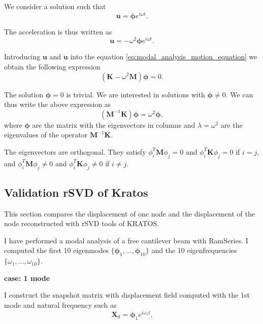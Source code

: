 \documentclass{article}
\begin{document}
We consider a solution such that
\begin{equation}
  \bm{u} = \bm{\phi} e^{i \omega t}.
\end{equation}

The acceleration is thus written as
\begin{equation}
  \bm{\ddot{u}} = -\omega^2 \bm{\phi} e^{i \omega t}.
\end{equation}

Introducing $\bm{u}$ and $\bm{\ddot{u}}$ into the equation \ref{eq:modal_analysis_motion_equation} we obtain the following expression
\begin{equation}
  (\bm{K} - \omega^2 \bm{M}) \bm{\phi} = 0.
\end{equation}

The solution $\bm{\phi} = 0$ is trivial. We are interested in solutions with $\bm{\phi} \neq 0$. We can thus write the above expression as
\begin{equation}
  (\bm{M}^{-1}\bm{K})\bm{\phi} = \omega^2 \bm{\phi},
\end{equation}
where $\bm{\phi}$ are the matrix with the eigenvectors in columns and $\lambda = \omega^2$ are the eigenvalues of the operator $\bm{M}^{-1}\bm{K}$. \newline

The eigenvectors are orthogonal. They satisfy $\phi_i^T \bm{M} \phi_j = 0$ and $\phi_i^T \bm{K} \phi_j = 0$ if $i=j$, and $\phi_i^T \bm{M} \phi_j \neq 0$ and $\phi_i^T \bm{K} \phi_j \neq 0$ if $i \neq j$. 

\subsection*{Validation rSVD of Kratos}
This section compares the displacement of one node and the displacement of the node reconstructed with rSVD tools of KRATOS.\newline

I have performed a modal analysis of a free cantilever beam with RamSeries. I computed the first 10 eigenmodes $\{\bm{\phi}_1, \dots, \bm{\phi}_{10}\}$ and the 10 eigenfrequencies $\{ \omega_1, \dots, \omega_{10} \}$.\newline

\noindent \textbf{case: 1 mode}

I construct the snapshot matrix with displacement field computed with the 1st mode and natural frequency such as 
\begin{equation}
  \bm{X}_d = \bm{\phi}_1 e^{i \omega_1 t}.
\end{equation}
\end{document}
